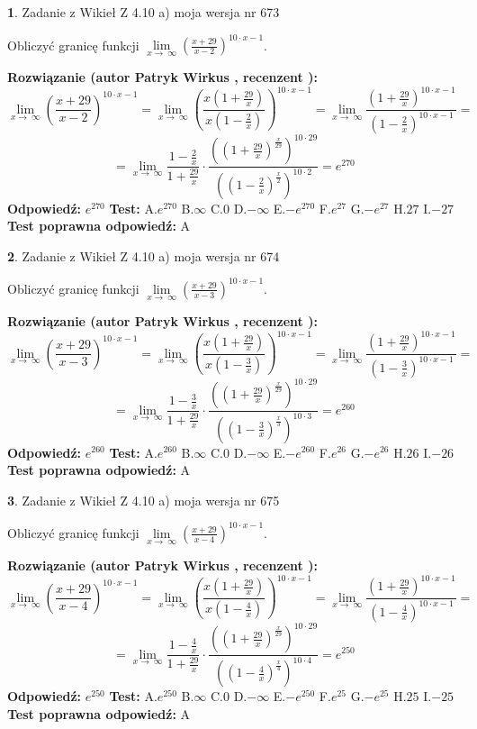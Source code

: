 \documentclass[12pt, a4paper]{article}
\theoremstyle{definition} %
\newtheorem{zad}{}
\newcommand{\zadStart}[1]{\begin{zad}#1\newline}
\newcommand{\zadStop}{\end{zad}}
\newcommand{\rozwStart}[2]{\noindent \textbf{Rozwiązanie (autor #1 , recenzent #2): }\newline}
\newcommand{\rozwStop}{\newline}
\newcommand{\odpStart}{\noindent \textbf{Odpowiedź:}\newline}
\newcommand{\odpStop}{\newline}
\newcommand{\testStart}{\noindent \textbf{Test:}\newline}
\newcommand{\testStop}{\newline}
\newcommand{\kluczStart}{\noindent \textbf{Test poprawna odpowiedź:}\newline}
\newcommand{\kluczStop}{\newline}
\begin{document}
\zadStart{Zadanie z Wikieł Z 4.10 a) moja wersja nr 673}

Obliczyć granicę funkcji  $\lim\limits_{x\to\ \infty}(\frac{x+29}{x-2})^{10\cdot x-1}$.
\zadStop
\rozwStart{Patryk Wirkus}{}
$$\lim\limits_{x\to\ \infty}(\frac{x+29}{x-2})^{10\cdot x-1} = \lim\limits_{x\to\ \infty}(\frac{x(1+\frac{29}{x})}{x(1-\frac{2}{x})})^{10\cdot x-1}=\lim\limits_{x\to\ \infty}\frac{(1+\frac{29}{x})^{10\cdot x-1}}{(1-\frac{2}{x})^{10\cdot x-1}}=$$
$$=\lim\limits_{x\to\ \infty}\frac{1-\frac{2}{x}}{1+\frac{29}{x}}\cdot\frac{((1+\frac{29}{x})^{\frac{x}{29}})^{10\cdot29}}{((1-\frac{2}{x})^{\frac{x}{2}})^{10\cdot2}}=e^{270}$$
\rozwStop
\odpStart
$e^{270}$
\odpStop
\testStart
A.$e^{270}$ B.$\infty$ C.$0$ D.$-\infty$ E.$-e^{270}$
F.$e^{27}$ G.$-e^{27}$
H.$27$
I.$-27$
\testStop
\kluczStart
A
\kluczStop



\zadStart{Zadanie z Wikieł Z 4.10 a) moja wersja nr 674}

Obliczyć granicę funkcji  $\lim\limits_{x\to\ \infty}(\frac{x+29}{x-3})^{10\cdot x-1}$.
\zadStop
\rozwStart{Patryk Wirkus}{}
$$\lim\limits_{x\to\ \infty}(\frac{x+29}{x-3})^{10\cdot x-1} = \lim\limits_{x\to\ \infty}(\frac{x(1+\frac{29}{x})}{x(1-\frac{3}{x})})^{10\cdot x-1}=\lim\limits_{x\to\ \infty}\frac{(1+\frac{29}{x})^{10\cdot x-1}}{(1-\frac{3}{x})^{10\cdot x-1}}=$$
$$=\lim\limits_{x\to\ \infty}\frac{1-\frac{3}{x}}{1+\frac{29}{x}}\cdot\frac{((1+\frac{29}{x})^{\frac{x}{29}})^{10\cdot29}}{((1-\frac{3}{x})^{\frac{x}{3}})^{10\cdot3}}=e^{260}$$
\rozwStop
\odpStart
$e^{260}$
\odpStop
\testStart
A.$e^{260}$ B.$\infty$ C.$0$ D.$-\infty$ E.$-e^{260}$
F.$e^{26}$ G.$-e^{26}$
H.$26$
I.$-26$
\testStop
\kluczStart
A
\kluczStop



\zadStart{Zadanie z Wikieł Z 4.10 a) moja wersja nr 675}

Obliczyć granicę funkcji  $\lim\limits_{x\to\ \infty}(\frac{x+29}{x-4})^{10\cdot x-1}$.
\zadStop
\rozwStart{Patryk Wirkus}{}
$$\lim\limits_{x\to\ \infty}(\frac{x+29}{x-4})^{10\cdot x-1} = \lim\limits_{x\to\ \infty}(\frac{x(1+\frac{29}{x})}{x(1-\frac{4}{x})})^{10\cdot x-1}=\lim\limits_{x\to\ \infty}\frac{(1+\frac{29}{x})^{10\cdot x-1}}{(1-\frac{4}{x})^{10\cdot x-1}}=$$
$$=\lim\limits_{x\to\ \infty}\frac{1-\frac{4}{x}}{1+\frac{29}{x}}\cdot\frac{((1+\frac{29}{x})^{\frac{x}{29}})^{10\cdot29}}{((1-\frac{4}{x})^{\frac{x}{4}})^{10\cdot4}}=e^{250}$$
\rozwStop
\odpStart
$e^{250}$
\odpStop
\testStart
A.$e^{250}$ B.$\infty$ C.$0$ D.$-\infty$ E.$-e^{250}$
F.$e^{25}$ G.$-e^{25}$
H.$25$
I.$-25$
\testStop
\kluczStart
A
\kluczStop
\end{document}

